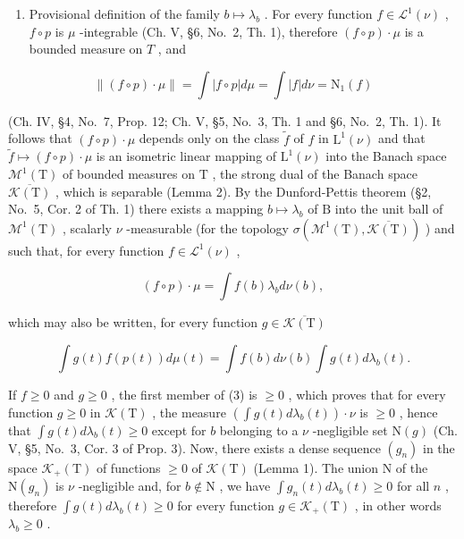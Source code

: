 \begin{enumerate}
\def\labelenumi{\arabic{enumi})}
\setcounter{enumi}{1}
\tightlist
\item
  Provisional definition of the family \(b \mapsto \lambda_b\) . For every function \(f \in \mathcal{L}^1(\nu)\) , \(f \circ p\) is \(\mu\) -integrable (Ch. V, §6, No.~2, Th. 1), therefore \((f \circ p) \cdot \mu\) is a bounded measure on \(T\) , and
\end{enumerate}

\[
\left\| (f \circ p) \cdot \mu \right\| = \int | f \circ p | d \mu = \int | f | d \nu = \mathrm{N} _ {1} (f)
\]

(Ch. IV, §4, No.~7, Prop. 12; Ch. V, §5, No.~3, Th. 1 and §6, No.~2, Th. 1). It follows that \((f \circ p) \cdot \mu\) depends only on the class \(\widetilde{f}\) of \(f\) in \(\mathrm{L}^1(\nu)\) and that \(\widetilde{f} \mapsto (f \circ p) \cdot \mu\) is an isometric linear mapping of \(\mathrm{L}^1(\nu)\) into the Banach space \(\mathcal{M}^1(\mathrm{T})\) of bounded measures on \(\mathrm{T}\) , the strong dual of the Banach space \(\overline{\mathcal{K}(\mathrm{T})}\) , which is separable (Lemma 2). By the Dunford-Pettis theorem (§2, No.~5, Cor. 2 of Th. 1) there exists a mapping \(b \mapsto \lambda_b\) of \(\mathrm{B}\) into the unit ball of \(\mathcal{M}^1(\mathrm{T})\) , scalarly \(\nu\) -measurable (for the topology \(\sigma(\mathcal{M}^1(\mathrm{T}), \overline{\mathcal{K}(\mathrm{T})})\) ) and such that, for every function \(f \in \mathcal{L}^1(\nu)\) ,

\[
(f \circ p) \cdot \mu = \int f (b) \lambda_ {b} d \nu (b),\tag{2}
\]

which may also be written, for every function \(g \in \overline{\mathcal{K}(\mathrm{T})}\)

\[
\int g (t) f (p (t)) d \mu (t) = \int f (b) d \nu (b) \int g (t) d \lambda_ {b} (t).\tag{3}
\]

If \(f \geqslant 0\) and \(g \geqslant 0\) , the first member of (3) is \(\geqslant 0\) , which proves that for every function \(g \geqslant 0\) in \(\mathcal{K}(\mathrm{T})\) , the measure \(\left( \int g(t) d\lambda_b(t) \right) \cdot \nu\) is \(\geqslant 0\) , hence that \(\int g(t) d\lambda_b(t) \geqslant 0\) except for \(b\) belonging to a \(\nu\) -negligible set \(\mathrm{N}(g)\) (Ch. V, §5, No.~3, Cor. 3 of Prop. 3). Now, there exists a dense sequence \((g_n)\) in the space \(\mathcal{K}_+(\mathrm{T})\) of functions \(\geqslant 0\) of \(\mathcal{K}(\mathrm{T})\) (Lemma 1). The union \(\mathrm{N}\) of the \(\mathrm{N}(g_n)\) is \(\nu\) -negligible and, for \(b \notin \mathrm{N}\) , we have \(\int g_n(t) d\lambda_b(t) \geqslant 0\) for all \(n\) , therefore \(\int g(t) d\lambda_b(t) \geqslant 0\) for every function \(g \in \mathcal{K}_+(\mathrm{T})\) , in other words \(\lambda_b \geqslant 0\) .

